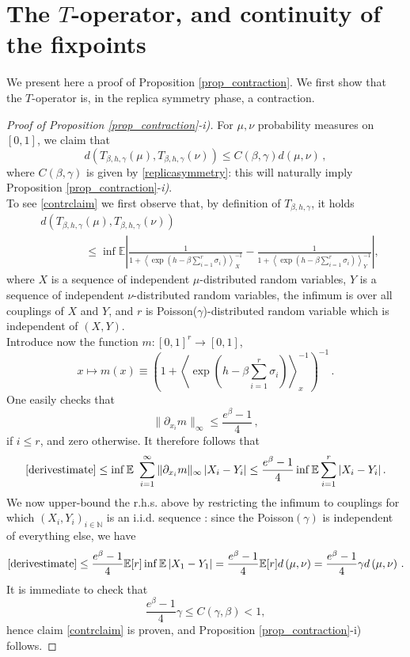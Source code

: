 \documentclass[a4paper,12pt,oneside,reqno]{amsart}
\numberwithin{equation}{section}
\begin{document}
\section{The $T$-operator, and continuity of the fixpoints}\label{proof_T}
We present here a proof of Proposition \ref{prop_contraction}. We first show that the $T$-operator is, in the replica symmetry phase, a contraction. 
\begin{proof}[Proof of Proposition \ref{prop_contraction}-i)]
For  $\mu,\nu$ probability measures on $[0,1]$, we claim that 
\begin{equation} \label{contrclaim}
d\left( T_{{\beta}, h, \gamma}(\mu), T_{{\beta}, h, \gamma}(\nu) \right) \leq C({\beta}, \gamma) d(\mu, \nu)\,,
\end{equation}
where $C({\beta}, \gamma)$ is given by \eqref{replicasymmetry}: this will naturally imply Proposition \ref{prop_contraction}-{\it i)}. \\

\noindent To see \eqref{contrclaim} we first observe that, by definition of $T_{{\beta}, h, \gamma}$, it holds
\begin{equation} \begin{aligned} \label{derivestimate} 
& d\left( T_{{\beta}, h, \gamma}(\mu), T_{{\beta}, h, \gamma}(\nu) \right) \\
& \qquad \qquad \leq \inf {{\mathbb{E}}}\left|\frac{1}{1+ \left< \exp\left(h-\beta\sum_{i=1}^r \sigma_i\right) \right>^{-1}_X}-\frac{1}{1+ \left< \exp\left(h-\beta\sum_{i=1}^r \sigma_i\right) \right>^{-1}_Y} \right|, 
\end{aligned} \end{equation}
where $X$ is a sequence of independent $\mu$-distributed random variables, $Y$ is a sequence of independent $\nu$-distributed random variables, the infimum is over all couplings of $X$ and $Y$, and $r$ is Poisson($\gamma$)-distributed random variable which is independent of $(X,Y)$. \\
Introduce now the function $m: [0,1]^r \to [0,1]$,
\[
x\mapsto m(x) {\equiv} \left(1+ \left< \exp\left(h-\beta\sum_{i=1}^r \sigma_i\right) \right>^{-1}_x\right)^{-1}\,.
\] 
One easily checks that
\[
\| \partial_{x_i} m\|_{\infty} \leq \frac{e^\beta -1}{4}\,, 
\]
if $ i\leq r$, and zero otherwise. It therefore follows that  
\[
\eqref{derivestimate} \leq \inf {{\mathbb{E}}}\ \sum\limits_{i=1}^\infty \| \partial_{x_i} m\|_{\infty} \left| X_i-Y_i \right|\leq \frac{e^\beta -1}{4}\inf {{\mathbb{E}}} \sum\limits_{i=1}^r \left| X_i-Y_i \right|.
\]
We now upper-bound the r.h.s. above by restricting the infimum to couplings for which $(X_i,Y_i)_{i\in {\mathbb{N}}}$ is an i.i.d. sequence : since  the Poisson$(\gamma)$ is independent of everything else, we have
\[
\eqref{derivestimate} \leq \frac{e^\beta -1}{4} {{\mathbb{E}}}[r] \inf {{\mathbb{E}}} \left| X_1-Y_1 \right|=  \frac{e^\beta -1}{4} {{\mathbb{E}}}[r] d\left(\mu,\nu\right) =  \frac{e^\beta -1}{4} \gamma d\left(\mu,\nu\right) \,.
\]
It is immediate to check that $$\frac{e^\beta -1}{4}\gamma \leq C(\gamma,\beta)< 1,$$
hence claim \eqref{contrclaim} is proven, and Proposition \ref{prop_contraction}-i) follows. 
\end{proof}
\end{document}
